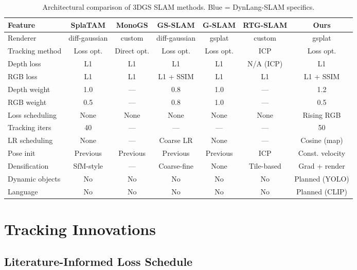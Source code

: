 \documentclass[10pt,twocolumn]{article}
\begin{document}
\begin{table}[t]
\centering
\caption{Architectural comparison of 3DGS SLAM methods. \textcolor{ours}{Blue} = DynLang-SLAM specifics.}
\label{tab:comparison}
\small
\begin{tabular}{@{}lcccccc@{}}
\toprule
\textbf{Feature} & \textbf{SplaTAM} & \textbf{MonoGS} & \textbf{GS-SLAM} & \textbf{G-SLAM} & \textbf{RTG-SLAM} & \textbf{\textcolor{ours}{Ours}} \\
\midrule
Renderer & diff-gaussian & custom & diff-gaussian & gsplat & custom & \textcolor{ours}{gsplat} \\
Tracking method & Loss opt. & Direct opt. & Loss opt. & Loss opt. & ICP & \textcolor{ours}{Loss opt.} \\
Depth loss & L1 & L1 & L1 & L1 & N/A (ICP) & \textcolor{ours}{L1} \\
RGB loss & L1 & L1 & L1 + SSIM & L1 & L1 & \textcolor{ours}{L1 + SSIM} \\
Depth weight & 1.0 & --- & 0.8 & 1.0 & --- & \textcolor{ours}{1.2} \\
RGB weight & 0.5 & --- & 0.8 & 1.0 & --- & \textcolor{ours}{0.5} \\
Loss scheduling & None & None & None & None & None & \textcolor{ours}{Rising RGB} \\
Tracking iters & 40 & --- & --- & --- & --- & \textcolor{ours}{50} \\
LR scheduling & None & --- & Coarse LR & None & --- & \textcolor{ours}{Cosine (map)} \\
Pose init & Previous & Previous & Previous & Previous & ICP & \textcolor{ours}{Const. velocity} \\
Densification & SfM-style & --- & Coarse-fine & None & Tile-based & \textcolor{ours}{Grad + render} \\
Dynamic objects & No & No & No & No & No & \textcolor{ours}{Planned (YOLO)} \\
Language & No & No & No & No & No & \textcolor{ours}{Planned (CLIP)} \\
\bottomrule
\end{tabular}
\end{table}

\section{Tracking Innovations}

\subsection{Literature-Informed Loss Schedule}
\label{sec:loss_schedule}
\end{document}
